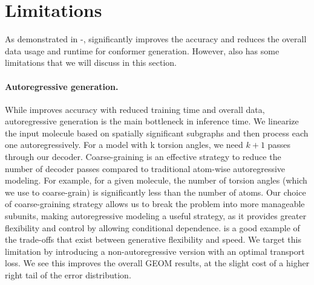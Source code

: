 \section{Limitations}
\label{section:appendix-limits}
\vspace{-1ex}
As demonstrated in -, \model significantly improves the accuracy and reduces
the overall data usage and runtime for conformer generation. However, \model also has some limitations that we will discuss in this section.

\paragraph{Autoregressive generation.} While \model improves accuracy with reduced training time and overall data, autoregressive generation is the main bottleneck in inference time. We linearize the input molecule based on spatially significant subgraphs and then process each one autoregressively. For a model with k torsion angles, we need $k+1$ passes through our decoder. 
Coarse-graining is an effective strategy to reduce the number of decoder passes compared to traditional atom-wise autoregressive modeling. For example, for a given molecule, the number of torsion angles (which we use to coarse-grain) is significantly less than the number of atoms.
Our choice of coarse-graining strategy allows us to break the problem into more manageable subunits, making autoregressive modeling a useful strategy, as it provides greater flexibility and control by allowing conditional dependence.
\model is a good example of the trade-offs that exist between generative flexibility and speed. We target this limitation by introducing a non-autoregressive version with an optimal transport loss. We see this improves the overall GEOM results, at the slight cost of a higher right tail of the error distribution.

